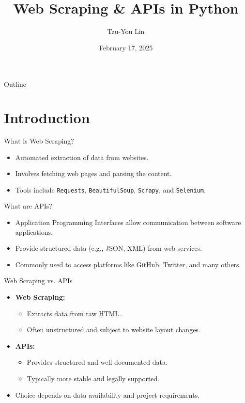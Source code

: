 \documentclass[10pt]{beamer}
\title{Web Scraping \& APIs in Python}
\author{Tzu-You Lin}
\date{February 17, 2025}
\begin{document}
\begin{frame}[fragile]
    \titlepage
\end{frame}

\begin{frame}[fragile]{Outline}
    \tableofcontents
\end{frame}

\section{Introduction}
\begin{frame}[fragile]{What is Web Scraping?}
    \begin{itemize}
        \item Automated extraction of data from websites.
        \item Involves fetching web pages and parsing the content.
        \item Tools include \texttt{Requests}, \texttt{BeautifulSoup}, \texttt{Scrapy}, and \texttt{Selenium}.
    \end{itemize}
\end{frame}

\begin{frame}[fragile]{What are APIs?}
    \begin{itemize}
        \item Application Programming Interfaces allow communication between software applications.
        \item Provide structured data (e.g., JSON, XML) from web services.
        \item Commonly used to access platforms like GitHub, Twitter, and many others.
    \end{itemize}
\end{frame}

\begin{frame}[fragile]{Web Scraping vs. APIs}
    \begin{itemize}
        \item \textbf{Web Scraping:}
        \begin{itemize}
            \item Extracts data from raw HTML.
            \item Often unstructured and subject to website layout changes.
        \end{itemize}
        \item \textbf{APIs:}
        \begin{itemize}
            \item Provides structured and well-documented data.
            \item Typically more stable and legally supported.
        \end{itemize}
        \item Choice depends on data availability and project requirements.
    \end{itemize}
\end{frame}
\end{document}

